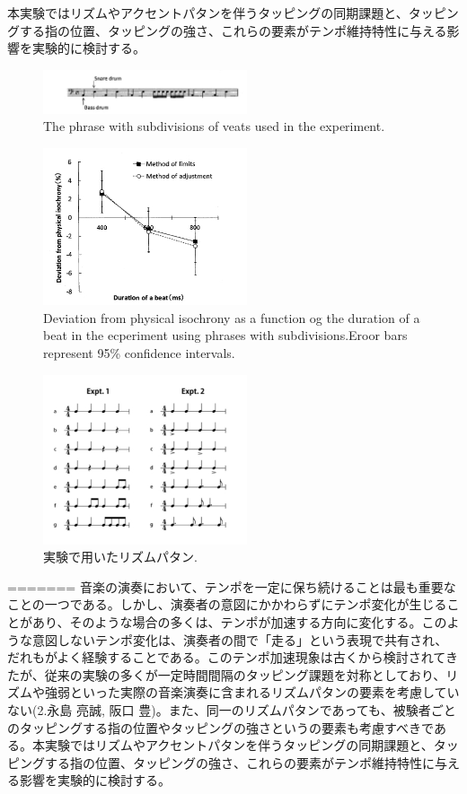 \documentclass[twocolumn,10pt]{jarticle}
\begin{document}
本実験ではリズムやアクセントパタンを伴うタッピングの同期課題と、タッピングする指の位置、タッピングの強さ、これらの要素がテンポ維持特性に与える影響を実験的に検討する。
\begin{figure}
  \centering
  \includegraphics[width=6cm]{Arao_f1.jpg}
  \caption{The phrase with subdivisions of veats used in the experiment.\cite{Arao}}
  \label{Arao_f1}
\end{figure}
\begin{figure}
  \centering
  \includegraphics[width=6cm]{Arao_f2.jpg}
  \caption{Deviation from physical isochrony as a function og the duration of a beat in the ecperiment using phrases with subdivisions.Eroor bars represent 95\% confidence intervals.\cite{Arao}}
  \label{Arao_f2}
\end{figure}
\begin{figure}
  \centering
  \includegraphics[width=6cm]{Nagasima.jpg}
  \caption{実験で用いたリズムパタン.\cite{Nagasima}}
  \label{Nagasima}
\end{figure}
=======
音楽の演奏において、テンポを一定に保ち続けることは最も重要なことの一つである。しかし、演奏者の意図にかかわらずにテンポ変化が生じることがあり、そのような場合の多くは、テンポが加速する方向に変化する。このような意図しないテンポ変化は、演奏者の間で「走る」という表現で共有され、だれもがよく経験することである。このテンポ加速現象は古くから検討されてきたが、従来の実験の多くが一定時間間隔のタッピング課題を対称としており、リズムや強弱といった実際の音楽演奏に含まれるリズムパタンの要素を考慮していない(2.永島 亮誠, 阪口 豊)。また、同一のリズムパタンであっても、被験者ごとのタッピングする指の位置やタッピングの強さというの要素も考慮すべきである。本実験ではリズムやアクセントパタンを伴うタッピングの同期課題と、タッピングする指の位置、タッピングの強さ、これらの要素がテンポ維持特性に与える影響を実験的に検討する。
\end{document}
